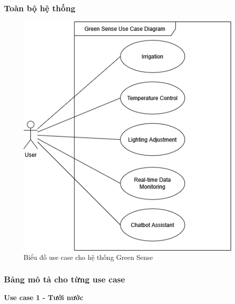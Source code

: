 \subsubsection{Toàn bộ hệ thống}
\begin{figure}[H]
    \centering
    \includegraphics[width=0.5\linewidth]{content/images/GreenSense_UC_Diagram.png}
    \caption{Biểu đồ use case cho hệ thống Green Sense}
    \label{fig:useCaseDiagram}
\end{figure}
\subsubsection{Bảng mô tả cho từng use case}
\textbf{Use case 1 - Tưới nước}

